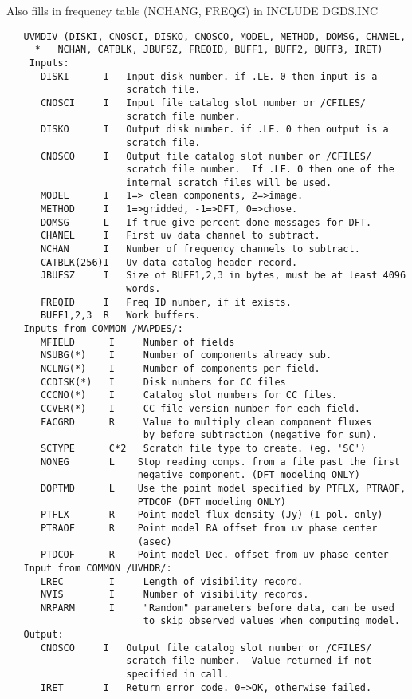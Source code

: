    Also fills in frequency table (NCHANG, FREQG) in INCLUDE DGDS.INC
\begin{verbatim}
   UVMDIV (DISKI, CNOSCI, DISKO, CNOSCO, MODEL, METHOD, DOMSG, CHANEL,
     *   NCHAN, CATBLK, JBUFSZ, FREQID, BUFF1, BUFF2, BUFF3, IRET)
    Inputs:
      DISKI      I   Input disk number. if .LE. 0 then input is a
                     scratch file.
      CNOSCI     I   Input file catalog slot number or /CFILES/
                     scratch file number.
      DISKO      I   Output disk number. if .LE. 0 then output is a
                     scratch file.
      CNOSCO     I   Output file catalog slot number or /CFILES/
                     scratch file number.  If .LE. 0 then one of the
                     internal scratch files will be used.
      MODEL      I   1=> clean components, 2=>image.
      METHOD     I   1=>gridded, -1=>DFT, 0=>chose.
      DOMSG      L   If true give percent done messages for DFT.
      CHANEL     I   First uv data channel to subtract.
      NCHAN      I   Number of frequency channels to subtract.
      CATBLK(256)I   Uv data catalog header record.
      JBUFSZ     I   Size of BUFF1,2,3 in bytes, must be at least 4096
                     words.
      FREQID     I   Freq ID number, if it exists.
      BUFF1,2,3  R   Work buffers.
   Inputs from COMMON /MAPDES/:
      MFIELD      I     Number of fields
      NSUBG(*)    I     Number of components already sub.
      NCLNG(*)    I     Number of components per field.
      CCDISK(*)   I     Disk numbers for CC files
      CCCNO(*)    I     Catalog slot numbers for CC files.
      CCVER(*)    I     CC file version number for each field.
      FACGRD      R     Value to multiply clean component fluxes
                        by before subtraction (negative for sum).
      SCTYPE      C*2   Scratch file type to create. (eg. 'SC')
      NONEG       L    Stop reading comps. from a file past the first
                       negative component. (DFT modeling ONLY)
      DOPTMD      L    Use the point model specified by PTFLX, PTRAOF,
                       PTDCOF (DFT modeling ONLY)
      PTFLX       R    Point model flux density (Jy) (I pol. only)
      PTRAOF      R    Point model RA offset from uv phase center
                       (asec)
      PTDCOF      R    Point model Dec. offset from uv phase center
   Input from COMMON /UVHDR/:
      LREC        I     Length of visibility record.
      NVIS        I     Number of visibility records.
      NRPARM      I     "Random" parameters before data, can be used
                        to skip observed values when computing model.
   Output:
      CNOSCO     I   Output file catalog slot number or /CFILES/
                     scratch file number.  Value returned if not
                     specified in call.
      IRET       I   Return error code. 0=>OK, otherwise failed.
\end{verbatim}

